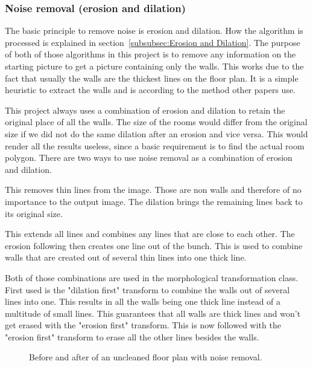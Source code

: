 \subsubsection{Noise removal (erosion and dilation)}
The basic principle to remove noise is erosion and dilation. How the algorithm is processed is explained in section~\ref{subsubsec:Erosion and Dilation}.
The purpose of both of those algorithms in this project is to remove any information on the starting picture to get a picture containing only the walls. This works due to the fact that usually the walls are the thickest lines on the floor plan. It is a simple heuristic to extract the walls and is according to the method other papers use. 

This project always uses a combination of erosion and dilation to retain the original place of all the walls. The size of the rooms would differ from the original size if we did not do the same dilation after an erosion and vice versa. This would render all the results useless, since a basic requirement is to find the actual room polygon. There are two ways to use noise removal as a combination of erosion and dilation. 

\begin{description}[style=nextline]
	\item[Erosion first] This removes thin lines from the image. Those are non walls and therefore of no importance to the output image. The dilation brings the remaining lines back to its original size.
	\item[Dilation first] This extends all lines and combines any lines that are close to each other. The erosion following then creates one line out of the bunch. This is used to combine walls that are created out of several thin lines into one thick line.
\end{description}

Both of those combinations are used in the morphological transformation class. First used is the "dilation first" transform to combine the walls out of several lines into one. This results in all the walls being one thick line instead of a multitude of small lines. This guarantees that all walls are thick lines and won't get erased with the "erosion first" transform. This is now followed with the "erosion first" transform to erase all the other lines besides the walls. 

\begin{figure}[h]
	\centering
	\hfill
	\caption{Before and after of an uncleaned floor plan with noise removal. }
\end{figure}

